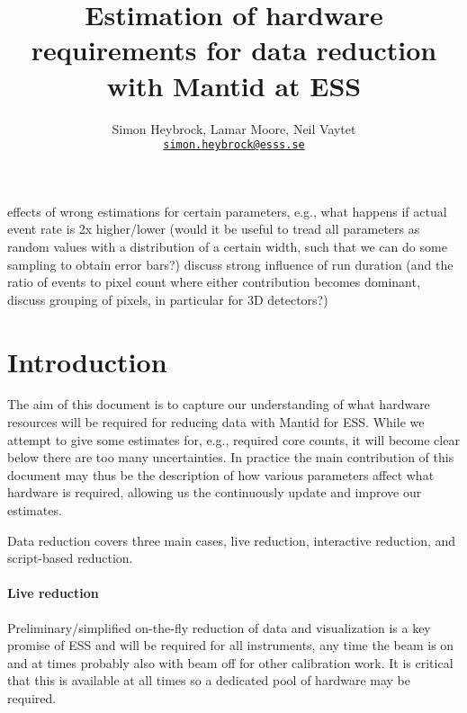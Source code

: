 \documentclass[a4paper,english,numbers=noenddot,bibliography=totoc,chapterprefix=on,DIV=12]{scrartcl}
\begin{document}
\title{Estimation of hardware requirements for data reduction with Mantid at ESS}
\author{Simon Heybrock, Lamar Moore, Neil Vaytet\\
    {\small\href{mailto:simon.heybrock@esss.se}{\nolinkurl{simon.heybrock@esss.se}}}}

\maketitle

\tableofcontents

effects of wrong estimations for certain parameters, e.g., what happens if actual event rate is 2x higher/lower (would it be useful to tread all parameters as random values with a distribution of a certain width, such that we can do some sampling to obtain error bars?)
discuss strong influence of run duration (and the ratio of events to pixel count where either contribution becomes dominant, discuss grouping of pixels, in particular for 3D detectors?)

\section{Introduction}

The aim of this document is to capture our understanding of what hardware resources will be required for reducing data with Mantid for ESS.
While we attempt to give some estimates for, e.g., required core counts, it will become clear below there are too many uncertainties. In practice the main contribution of this document may thus be the description of how various parameters affect what hardware is required, allowing us the continuously update and improve our estimates.

Data reduction covers three main cases, live reduction, interactive reduction, and script-based reduction.

\paragraph{Live reduction}
Preliminary/simplified on-the-fly reduction of data and visualization is a key promise of ESS and will be required for all instruments, any time the beam is on and at times probably also with beam off for other calibration work.
It is critical that this is available at all times so a dedicated pool of hardware may be required.
\end{document}
